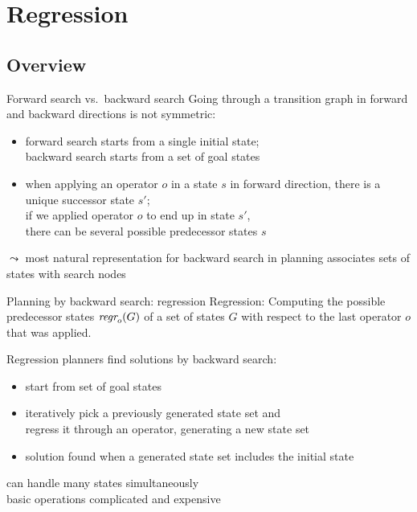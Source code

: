\documentclass{gkibeamer}
\begin{document}
\section{Regression}
\subsection{Overview}

\begin{frame}{Forward search vs.\ backward search}
  Going through a transition graph in forward and backward directions
  is \alert{not symmetric}:
  \begin{itemize}
  \item forward search starts from a \alert{single}
    initial state; \\
    backward search starts from a \alert{set} of goal states
  \item when applying an operator $o$ in a state $s$ in forward
    direction, there is a \alert{unique successor state} $s'$; \\
    if we applied operator $o$ to end up in state $s'$, \\
    there can be \alert{several possible predecessor states} $s$
  \end{itemize}

  $\leadsto$ most natural representation for backward search in
  planning associates \alert{sets of states} with search nodes
\end{frame}

\begin{frame}{Planning by backward search: regression}
  \alert{Regression:} Computing the possible predecessor states
  $\textit{regr}_{o}(G)$ of a set of states $G$ with respect to the last
  operator $o$ that was applied.

  \medskip

  \alert{Regression planners} find solutions by backward search:
  \begin{itemize}
  \item start from set of goal states
  \item iteratively pick a previously generated state set and \\
    \alert{regress it} through an operator, generating a new state set
  \item solution found when a generated state set includes the initial
    state
  \end{itemize}

  \medskip

   can handle many states simultaneously \\
   basic operations complicated and expensive
\end{frame}
\end{document}
